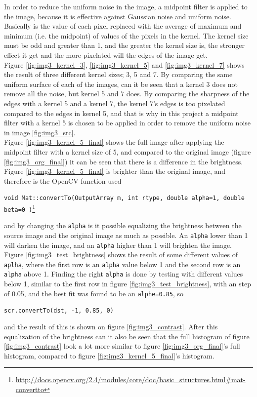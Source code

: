 In order to reduce the uniform noise in the image, a midpoint filter is applied to the image, because it is effective against Gaussian noise and uniform noise. Basically is the value of each pixel replaced with the average of maximum and minimum (i.e. the midpoint) of values of the pixels in the kernel. The kernel size must be odd and greater than 1, and the greater the kernel size is, the stronger effect it get and the more pixelated will the edges of the image get.\\[0.2cm]
Figure \ref{fig:img3_kernel_3}, \ref{fig:img3_kernel_5} and \ref{fig:img3_kernel_7} shows the result of three different kernel sizes; 3, 5 and 7. By comparing the same uniform surface of each of the images, can it be seen that a kernel 3 does not remove all the noise, but kernel 5 and 7 does. By comparing the sharpness of the edges with a kernel 5 and a kernel 7, the kernel 7's edges is too pixelated compared to the edges in kernel 5, and that is why in this project a midpoint filter with a kernel 5 is chosen to be applied in order to remove the uniform noise in image \ref{fig:img3_src}.\\[0.2cm]
Figure \ref{fig:img3_kernel_5_final} shows the full image after applying the midpoint filter with a kernel size of 5, and compared to the original image (figure \ref{fig:img3_org_final}) it can be seen that there is a difference in the brightness. Figure \ref{fig:img3_kernel_5_final} is brighter than the original image, and therefore is the OpenCV function used
\begin{center}
\lstinline|void Mat::convertTo(OutputArray m, int rtype, double alpha=1, double beta=0 )|\footnote{\url{http://docs.opencv.org/2.4/modules/core/doc/basic_structures.html\#mat-convertto}}
\end{center}
and by changing the \lstinline|alpha| is it possible equalizing the brightness between the source image and the original image as much as possible. An \lstinline|alpha| lower than 1 will darken the image, and an \lstinline|alpha| higher than 1 will brighten the image. Figure \ref{fig:img3_test_brightness} shows the result of some different values of \lstinline|aplha|, where the first row is an \lstinline|alpha| value below 1 and the second row is an \lstinline|alpha| above 1. Finding the right \lstinline|alpha| is done by testing with different values below 1, similar to the first row in figure \ref{fig:img3_test_brightness}, with an step of 0.05, and the best fit was found to be an \lstinline|alphe=0.85|, so 
\begin{center}
\lstinline|scr.convertTo(dst, -1, 0.85, 0)|
\end{center}
and the result of this is shown on figure \ref{fig:img3_contrast}. After this equalization  of the brightness can it also be seen that the full histogram of figure \ref{fig:img3_contrast} look a lot more similar to figure \ref{fig:img3_org_final}'s full histogram, compared to figure \ref{fig:img3_kernel_5_final}'s histogram.

